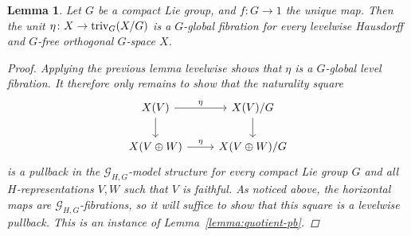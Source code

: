 \documentclass[reqno]{memo-l}
\theoremstyle{mythm}
\newtheorem{lemma}[thm]{Lemma}
\theoremstyle{definition}
\numberwithin{equation}{section}
\newcommand{\triv}{{\textup{triv}}}
\begin{document}
\begin{lemma}\label{lemma:unit-fibration}
    Let $G$ be a compact Lie group, and $f\colon G\to 1$ the unique map. Then the unit $\eta\colon X\to\triv_G(X/G)$ is a $G$-global fibration for every levelwise Hausdorff and $G$-free orthogonal $G$-space $X$.
    \begin{proof}
        Applying the previous lemma levelwise shows that $\eta$ is a $G$-global level fibration. It therefore only remains to show that  the naturality square
        \[
            \begin{tikzcd}
                X(V)\arrow[r,"\eta"]\arrow[d] & X(V)/G\arrow[d]\\
                X(V\oplus W)\arrow[r,"\eta"] & X(V\oplus W)/G
            \end{tikzcd}
        \]
        is a pullback in the $\mathcal G_{H,G}$-model structure for every compact Lie group $G$ and all $H$-representations $V,W$ such that $V$ is faithful. As noticed above, the horizontal maps are $\mathcal G_{H,G}$-fibrations, so it will suffice to show that this square is a levelwise pullback. This is an instance of Lemma~\ref{lemma:quotient-pb}.
    \end{proof}
\end{lemma}
\end{document}
